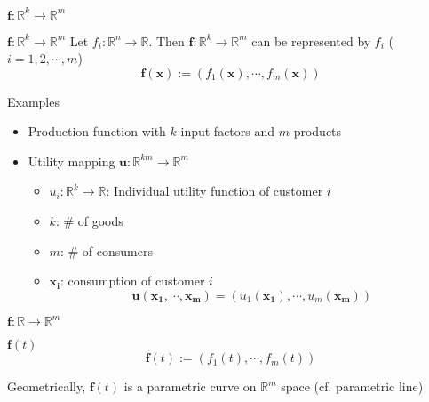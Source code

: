 \documentclass[a4paper,11pt]{article}
\begin{document}
\begin{frame}[t]{$\mathbf{f}:\mathbb{R}^k\rightarrow\mathbb{R}^m$}
	\begin{block}
		{$\mathbf{f}:\mathbb{R}^k\rightarrow\mathbb{R}^m$}
		Let $f_i: \mathbb{R}^n\rightarrow\mathbb{R}$. Then $\mathbf{f}:\mathbb{R}^k\rightarrow\mathbb{R}^m$ can be represented by $f_i$ ($i=1,2,\cdots,m$)
		\[
			\mathbf{f(x)}:=(f_1(\mathbf{x}),\cdots,f_m(\mathbf{x}))
		\]
	\end{block}
	\begin{block}
		{Examples}
		\begin{itemize}
			\item Production function with $k$ input factors and $m$ products
			\item Utility mapping $\mathbf{u}: \mathbb{R}^{km}\rightarrow\mathbb{R}^m$
			\begin{itemize}
				\item $u_i:\mathbb{R}^k\rightarrow\mathbb{R}$: Individual utility function of customer $i$
				\item $k$: \# of goods
				\item $m$: \# of consumers
				\item $\mathbf{x_i}$: consumption of customer $i$
				\[
					\mathbf{u}(\mathbf{x_1},\cdots,\mathbf{x_m})=(u_1(\mathbf{x_1}),\cdots,u_m(\mathbf{x_m}))
				\]
			\end{itemize}
		\end{itemize}
	\end{block}
\end{frame}
\begin{frame}[t]{$\mathbf{f}:\mathbb{R}\rightarrow\mathbb{R}^m$}
	\begin{block}
		{$\mathbf{f}(t)$}
		\[
			\mathbf{f}(t):=\left(f_1(t),\cdots,f_m(t)\right)
		\]
	\end{block}
	Geometrically, $\mathbf{f}(t)$ is a parametric curve on $\mathbb{R}^m$ space (cf. parametric line)
\end{frame}
\end{document}
